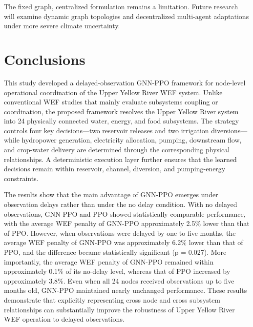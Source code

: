 \documentclass [a4paper,fleqn] {cas-dc}
\begin{document}
The fixed graph, centralized formulation remains a limitation. Future research will examine dynamic graph topologies and decentralized multi-agent adaptations under more severe climate uncertainty.

\section{Conclusions}
\label{sec6}

This study developed a delayed-observation GNN-PPO framework for node-level operational coordination of the Upper Yellow River WEF system. Unlike conventional WEF studies that mainly evaluate subsystems coupling or coordination, the proposed framework resolves the Upper Yellow River system into 24 physically connected water, energy, and food subsystems. The strategy controls four key decisions—two reservoir releases and two irrigation diversions—while hydropower generation, electricity allocation, pumping, downstream flow, and crop-water delivery are determined through the corresponding physical relationships. A deterministic execution layer further ensures that the learned decisions remain within reservoir, channel, diversion, and pumping-energy constraints.

The results show that the main advantage of GNN-PPO emerges under observation delays rather than under the no delay condition. With no delayed observations, GNN-PPO and PPO showed statistically comparable performance, with the average WEF penalty of GNN-PPO approximately 2.5\% lower than that of PPO. However, when observations were delayed by one to five months, the average WEF penalty of GNN-PPO was approximately 6.2\% lower than that of PPO, and the difference became statistically significant (p = 0.027). More importantly, the average WEF penalty of GNN-PPO remained within approximately 0.1\% of its no-delay level, whereas that of PPO increased by approximately 3.8\%. Even when all 24 nodes received observations up to five months old, GNN-PPO maintained nearly unchanged performance. These results demonstrate that explicitly representing cross node and cross subsystem relationships can substantially improve the robustness of Upper Yellow River WEF operation to delayed observations.
\end{document}
